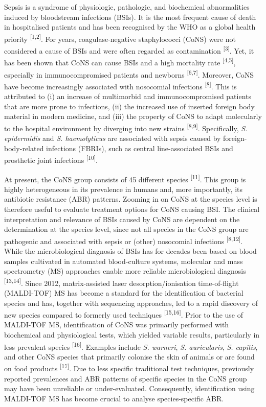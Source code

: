\documentclass[
]{book}
\begin{document}
Sepsis is a syndrome of physiologic, pathologic, and biochemical abnormalities induced by bloodstream infections (BSIs). It is the most frequent cause of death in hospitalised patients and has been recognised by the WHO as a global health priority \textsuperscript{{[}1,2{]}}. For years, coagulase-negative staphylococci (CoNS) were not considered a cause of BSIs and were often regarded as contamination \textsuperscript{{[}3{]}}. Yet, it has been shown that CoNS can cause BSIs and a high mortality rate \textsuperscript{{[}4,5{]}}, especially in immunocompromised patients and newborns \textsuperscript{{[}6,7{]}}. Moreover, CoNS have become increasingly associated with nosocomial infections \textsuperscript{{[}8{]}}. This is attributed to (i) an increase of multimorbid and immunocompromised patients that are more prone to infections, (ii) the increased use of inserted foreign body material in modern medicine, and (iii) the property of CoNS to adapt molecularly to the hospital environment by diverging into new strains \textsuperscript{{[}8,9{]}}. Specifically, \emph{S. epidermidis} and \emph{S. haemolyticus} are associated with sepsis caused by foreign-body-related infections (FBRIs), such as central line-associated BSIs and prosthetic joint infections \textsuperscript{{[}10{]}}.

At present, the CoNS group consists of 45 different species \textsuperscript{{[}11{]}}. This group is highly heterogeneous in its prevalence in humans and, more importantly, its antibiotic resistance (ABR) patterns. Zooming in on CoNS at the species level is therefore useful to evaluate treatment options for CoNS causing BSI. The clinical interpretation and relevance of BSIs caused by CoNS are dependent on the determination at the species level, since not all species in the CoNS group are pathogenic and associated with sepsis or (other) nosocomial infections \textsuperscript{{[}8,12{]}}. While the microbiological diagnosis of BSIs has for decades been based on blood samples cultivated in automated blood-culture systems, molecular and mass spectrometry (MS) approaches enable more reliable microbiological diagnosis \textsuperscript{{[}13,14{]}}. Since 2012, matrix-assisted laser desorption/ionisation time-of-flight (MALDI-TOF) MS has become a standard for the identification of bacterial species and has, together with sequencing approaches, led to a rapid discovery of new species compared to formerly used techniques \textsuperscript{{[}15,16{]}}. Prior to the use of MALDI-TOF MS, identification of CoNS was primarily performed with biochemical and physiological tests, which yielded variable results, particularly in less prevalent species \textsuperscript{{[}16{]}}. Examples include \emph{S. warneri}, \emph{S. auricularis}, \emph{S. capitis}, and other CoNS species that primarily colonise the skin of animals or are found on food products \textsuperscript{{[}17{]}}. Due to less specific traditional test techniques, previously reported prevalences and ABR patterns of specific species in the CoNS group may have been unreliable or under-evaluated. Consequently, identification using MALDI-TOF MS has become crucial to analyse species-specific ABR.
\end{document}
